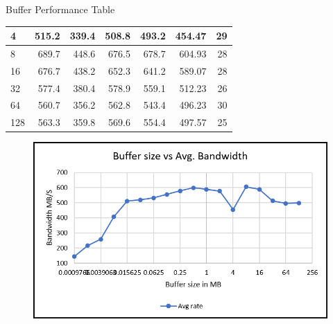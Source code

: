 \documentclass[aspectratio=169]{beamer}
\begin{document}
\begin{frame}{Buffer Performance Table}
\begin{minipage}{0.4\textwidth}
{\begin{tabular}{|p{1.8cm}|r|r|r|r|r|r|}
        \hline
        4           & 515.2 & 339.4 & 508.8 & 493.2 & 454.47 & 29 \\
        \hline
        \rowcolor{green!70}
        8           & 689.7 & 448.6 & 676.5 & 678.7 & 604.93 & 28 \\
        \hline
        16          & 676.7 & 438.2 & 652.3 & 641.2 & 589.07 & 28 \\
        \hline
        32          & 577.4 & 380.4 & 578.9 & 559.1 & 512.23 & 26 \\
        \hline
        64          & 560.7 & 356.2 & 562.8 & 543.4 & 496.23 & 30 \\
        \hline
        128         & 563.3 & 359.8 & 569.6 & 554.4 & 497.57 & 25 \\
        \hline
        \end{tabular}
        }
    \end{minipage}%
    \hfill
    \begin{minipage}{0.5\textwidth}
        \begin{figure}
            \centering
            \includegraphics[width=.8\textwidth]{Plot.png}
        \end{figure}
        \vspace{1em}
        \raggedright
    \end{minipage}

    \vfill
\end{frame}
\end{document}
